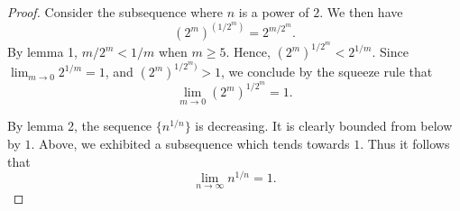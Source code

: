 \documentclass[12pt]{article}
\begin{document}
\begin{proof}
Consider the subsequence where $n$ is a power of $2$.
We then have
\[
 (2^m)^{(1/2^m)} =
 2^{m/2^m}.
\]
By lemma 1, $m/2^m < 1/m$ when $m \ge 5$.  Hence,
$(2^m)^{1/2^m} < 2^{1/m}$.  Since $\lim_{m \to 0}
2^{1/m} = 1$, and $(2^m)^{1/2^m)} > 1$, we conclude
by the squeeze rule that
\[
 \lim_{m \to 0} (2^m)^{1/2^m} = 1.
\]

By lemma 2, the sequence $\{n^{1/n}\}$ is decreasing.  It 
is clearly bounded from below by $1$.  Above, we exhibited
a subsequence which tends towards $1$.   Thus it follows that
\[
 \lim_{n \to \infty} n^{1/n} = 1.
\]

\end{proof}
\end{document}
